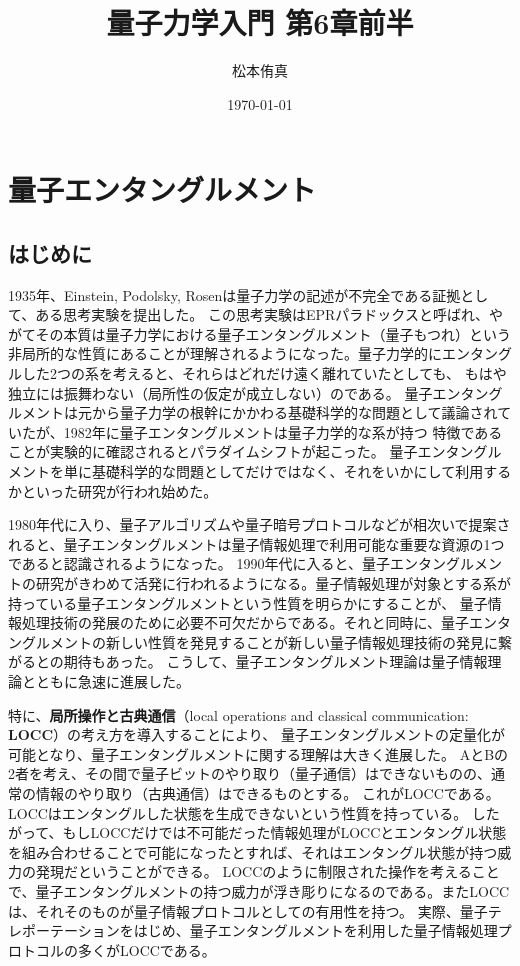 \documentclass[a4paper,11pt,uplatex]{jsarticle}%
\title{量子力学入門 第6章前半}
\author{松本侑真}
\date{\today}
\begin{document}
\maketitle
\tableofcontents
\newpage
\setcounter{section}{5}
\section{量子エンタングルメント}
\subsection{はじめに}
1935年、Einstein, Podolsky, Rosenは量子力学の記述が不完全である証拠として、ある思考実験を提出した。
この思考実験はEPRパラドックスと呼ばれ、やがてその本質は量子力学における量子エンタングルメント（量子もつれ）という
非局所的な性質にあることが理解されるようになった。量子力学的にエンタングルした2つの系を考えると、それらはどれだけ遠く離れていたとしても、
もはや独立には振舞わない（局所性の仮定が成立しない）のである。
量子エンタングルメントは元から量子力学の根幹にかかわる基礎科学的な問題として議論されていたが、1982年に量子エンタングルメントは量子力学的な系が持つ
特徴であることが実験的に確認されるとパラダイムシフトが起こった。
量子エンタングルメントを単に基礎科学的な問題としてだけではなく、それをいかにして利用するかといった研究が行われ始めた。

1980年代に入り、量子アルゴリズムや量子暗号プロトコルなどが相次いで提案されると、量子エンタングルメントは量子情報処理で利用可能な重要な資源の1つであると認識されるようになった。
1990年代に入ると、量子エンタングルメントの研究がきわめて活発に行われるようになる。量子情報処理が対象とする系が持っている量子エンタングルメントという性質を明らかにすることが、
量子情報処理技術の発展のために必要不可欠だからである。それと同時に、量子エンタングルメントの新しい性質を発見することが新しい量子情報処理技術の発見に繋がるとの期待もあった。
こうして、量子エンタングルメント理論は量子情報理論とともに急速に進展した。

特に、\textbf{局所操作と古典通信}（local operations and classical communication: \textbf{LOCC}）の考え方を導入することにより、
量子エンタングルメントの定量化が可能となり、量子エンタングルメントに関する理解は大きく進展した。
AとBの2者を考え、その間で量子ビットのやり取り（量子通信）はできないものの、通常の情報のやり取り（古典通信）はできるものとする。
これがLOCCである。LOCCはエンタングルした状態を生成できないという性質を持っている。
したがって、もしLOCCだけでは不可能だった情報処理がLOCCとエンタングル状態を組み合わせることで可能になったとすれば、それはエンタングル状態が持つ威力の発現だということができる。
LOCCのように制限された操作を考えることで、量子エンタングルメントの持つ威力が浮き彫りになるのである。またLOCCは、それそのものが量子情報プロトコルとしての有用性を持つ。
実際、量子テレポーテーションをはじめ、量子エンタングルメントを利用した量子情報処理プロトコルの多くがLOCCである。
\end{document}

